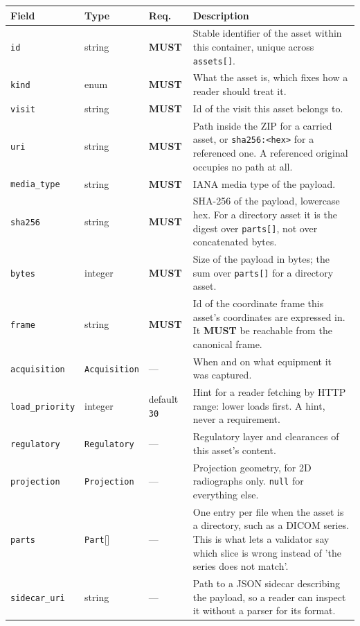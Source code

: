 \documentclass[11pt,a4paper]{article}
\newcommand{\MUST}{\textcolor{uosred}{\textbf{MUST}}}
\newcommand{\code}[1]{\texttt{\small #1}}
\begin{document}
\begin{longtable}{L{3.2cm} L{2.9cm} C{1.4cm} L{6.8cm}}
\toprule
\textbf{Field} & \textbf{Type} & \textbf{Req.} & \textbf{Description}\\
\midrule
\endhead
\code{id} & string & \MUST{} & Stable identifier of the asset within this container, unique across \code{assets[]}.\\
\code{kind} & enum & \MUST{} & What the asset is, which fixes how a reader should treat it.\\
\code{visit} & string & \MUST{} & Id of the visit this asset belongs to.\\
\code{uri} & string & \MUST{} & Path inside the ZIP for a carried asset, or \code{sha256:<hex>} for a referenced one. A referenced original occupies no path at all.\\
\code{media\_type} & string & \MUST{} & IANA media type of the payload.\\
\code{sha256} & string & \MUST{} & SHA-256 of the payload, lowercase hex. For a directory asset it is the digest over \code{parts[]}, not over concatenated bytes.\\
\code{bytes} & integer & \MUST{} & Size of the payload in bytes; the sum over \code{parts[]} for a directory asset.\\
\code{frame} & string & \MUST{} & Id of the coordinate frame this asset's coordinates are expressed in. It \MUST{} be reachable from the canonical frame.\\
\code{acquisition} & \code{Acquisition} & --- & When and on what equipment it was captured.\\
\code{load\_priority} & integer & default \code{30} & Hint for a reader fetching by HTTP range: lower loads first. A hint, never a requirement.\\
\code{regulatory} & \code{Regulatory} & --- & Regulatory layer and clearances of this asset's content.\\
\code{projection} & \code{Projection} & --- & Projection geometry, for 2D radiographs only. \code{null} for everything else.\\
\code{parts} & \code{Part}[] & --- & One entry per file when the asset is a directory, such as a DICOM series. This is what lets a validator say which slice is wrong instead of 'the series does not match'.\\
\code{sidecar\_uri} & string & --- & Path to a JSON sidecar describing the payload, so a reader can inspect it without a parser for its format.\\

\end{longtable}
\end{document}
